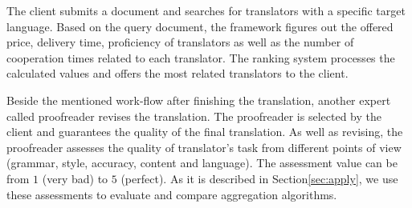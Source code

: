 The client submits a document and searches for translators with a specific target language. Based on the query document, the framework figures out the offered price, delivery time, proficiency of translators as well as the number of cooperation times related to each translator. The ranking system processes the calculated values and offers the most related translators to the client.

Beside the mentioned work-flow after finishing the translation, another expert called proofreader revises the translation. The proofreader is selected by the client and guarantees the quality of the final translation. As well as revising, the proofreader assesses the quality of translator's task from different points of view (grammar, style, accuracy, content and language). The assessment value can be from $1$ (very bad) to $5$ (perfect). As it is described in Section\ref{sec:apply}, we use these assessments to evaluate and compare aggregation algorithms.
